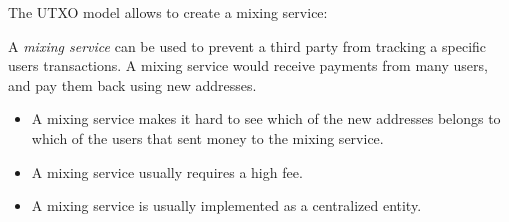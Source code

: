 
The UTXO model allows to create a mixing service:
\begin{definition}
	A \emph{mixing service} can be used to prevent a third party from tracking a specific users transactions. A mixing service would receive payments from many users, and pay them back using new addresses. 
\end{definition}

\begin{note}
	\begin{itemize}
		\item A mixing service makes it hard to see which of the new addresses belongs to which of the users that sent money to the mixing service.
		\item A mixing service usually requires a high fee.
		\item A mixing service is usually implemented as a centralized entity.
	\end{itemize}
\end{note}